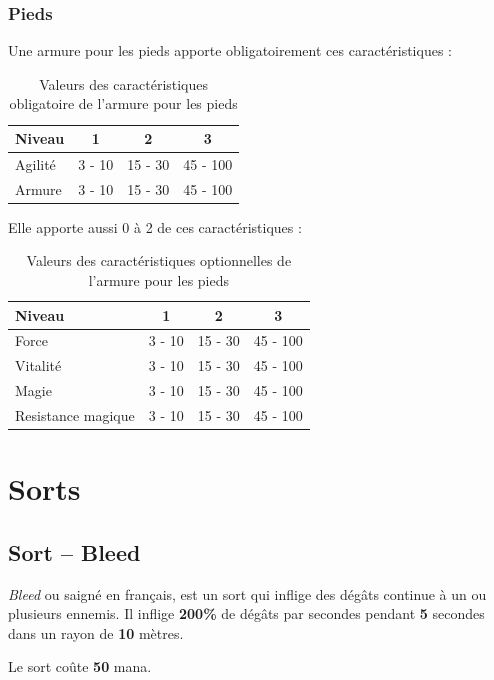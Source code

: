 \documentclass[11pt, a4paper, oneside]{report}
\begin{document}
\subsubsection{Pieds}
Une armure pour les pieds apporte obligatoirement ces caractéristiques :
\begin{table}[H]
\begin{center}
\begin{tabular}{| l | c | c | c |}
  \hline      
  Niveau 				& 1 & 2 & 3\\ \hline \hline
  Agilité 				& 3 - 10 & 15 - 30 & 45 - 100\\ \hline
  Armure 				& 3 - 10 & 15 - 30 & 45 - 100\\ \hline
\end{tabular}
\caption{Valeurs des caractéristiques obligatoire de l'armure pour les pieds}
\end{center}
\end{table}
Elle apporte aussi 0 à 2 de ces caractéristiques :
\begin{table}[H]
\begin{center}
\begin{tabular}{| l | c | c | c |}
  \hline      
  Niveau 				& 1 & 2 & 3\\ \hline \hline                 
  Force 				& 3 - 10 & 15 - 30 & 45 - 100\\ \hline
  Vitalité 				& 3 - 10 & 15 - 30 & 45 - 100\\ \hline
  Magie 				& 3 - 10 & 15 - 30 & 45 - 100\\ \hline
  Resistance magique 	& 3 - 10 & 15 - 30 & 45 - 100\\ \hline
\end{tabular}
\caption{Valeurs des caractéristiques optionnelles de l'armure pour les pieds}
\end{center}
\end{table}
\section{Sorts}
\subsection{Sort -- Bleed}
\emph{Bleed} ou saigné en français, est un sort qui inflige des dégâts continue à un ou plusieurs ennemis. Il inflige \textbf{200\%} de dégâts par secondes pendant \textbf{5} secondes dans un rayon de \textbf{10} mètres.

Le sort coûte \textbf{50} mana.\\
\end{document}
